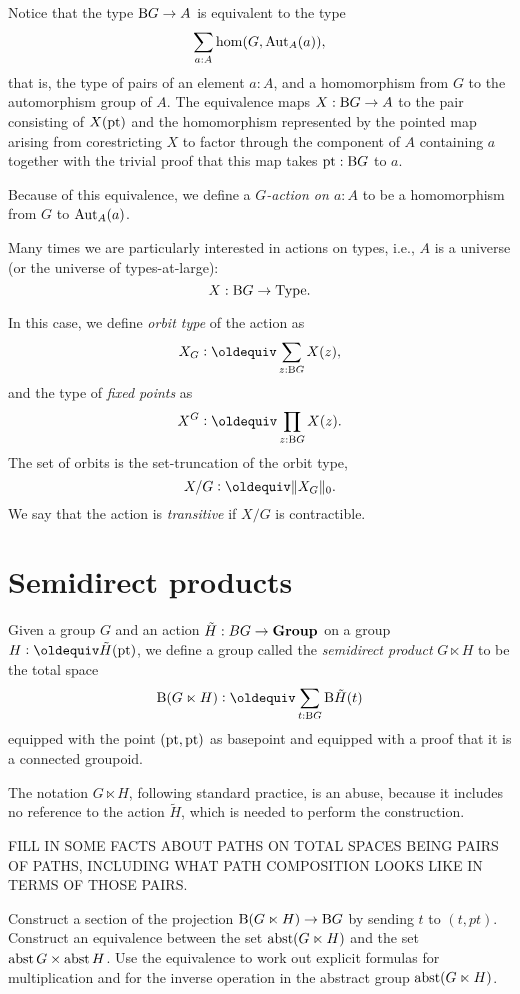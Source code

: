 Notice that the type $\mathrm B G \to A$ is equivalent to the type
\[
  \sum_{a:A}\hom(G,\operatorname{Aut}_A(a)),
\]
that is, the type of pairs of an element $a : A$,
and a homomorphism from $G$ to the automorphism group of $A$.
The equivalence maps $X:\mathrm B G\to A$ to the pair consisting of $X({\mathord{\mathrm{pt}}})$
and the homomorphism represented by the pointed map arising
from corestricting $X$ to factor through the component of $A$ containing $a$
together with the trivial proof that this map takes ${\mathord{\mathrm{pt}}}:\mathrm B G$ to $a$.

Because of this equivalence,
we define a \emph{$G$-action on $a:A$}
to be a homomorphism from $G$ to $\operatorname{Aut}_A(a)$.

Many times we are particularly interested in actions on types,
i.e., $A$ is a universe (or the universe of types-at-large):
\[
  X : \mathrm B G \to \mathord{\mathrm{Type}}.
\]

In this case, we define \emph{orbit type} of the action as
\[
  X_G \defeq \sum_{z:\B G} X(z),
\]
and the type of \emph{fixed points} as
\[
  X^G \defeq \prod_{z:\B G} X(z).
\]
The set of orbits is the set-truncation of the orbit type,
\[
  X / G \defeq \Trunc{X_G}_0.
\]
We say that the action is \emph{transitive} if $X / G$ is contractible.

\section{Semidirect products}
\label{sec:Semidirect-products}

\begin{definition}\label{def:semidirect-product}
  Given a group $G$ and an action $\tilde H : BG \to \mathbf{Group}$ on a group $H \defeq \tilde H(\pt)$, we define a group called the {\em
    semidirect product}
  $G \ltimes H$ to be the total space
  $$\Bop ( G \ltimes H ) \defeq \sum_{t:\B G} \B \tilde H(t)$$
  equipped with the point $({\mathord{\mathrm{pt}}},{\mathord{\mathrm{pt}}})$ as basepoint and equipped with a proof that it is a connected groupoid.
\end{definition}

The notation $G \ltimes H$, following standard practice, is an abuse, because it includes no reference to the action $\tilde H$, which is needed
to perform the construction.

FILL IN SOME FACTS ABOUT PATHS ON TOTAL SPACES BEING PAIRS OF PATHS, INCLUDING WHAT PATH COMPOSITION LOOKS LIKE IN TERMS OF THOSE PAIRS.

\begin{exercise}
  Construct a section of the projection $ \operatorname{B} ( G \ltimes H ) \to \mathrm B G $ by sending $t$ to $(t,pt)$.
  Construct an equivalence between the set $\operatorname{abst} (G \ltimes H)$ and the set $\operatorname{abst} G \times \operatorname{abst} H$.  Use the equivalence to work out
  explicit formulas for multiplication and for the inverse operation in the abstract group $\operatorname{abst} (G \ltimes H)$.
\end{exercise}


